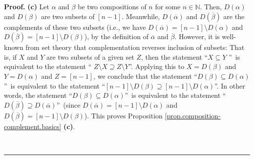 \documentclass[numbers=enddot,12pt,final,onecolumn,notitlepage]{scrartcl}%
\theoremstyle{definition}
\newenvironment{proof}[1][Proof]{\noindent\textbf{#1.} }{\ \rule{0.5em}{0.5em}}
\begin{document}
\begin{proof}
\textbf{(c)} Let $\alpha$ and $\beta$ be two compositions of $n$ for some
$n\in\mathbb{N}$. Then, $D\left(  \alpha\right)  $ and $D\left(  \beta\right)
$ are two subsets of $\left[  n-1\right]  $. Meanwhile, $D\left(
\overline{\alpha}\right)  $ and $D\left(  \overline{\beta}\right)  $ are the
complements of these two subsets (i.e., we have $D\left(  \overline{\alpha
}\right)  =\left[  n-1\right]  \setminus D\left(  \alpha\right)  $ and
$D\left(  \overline{\beta}\right)  =\left[  n-1\right]  \setminus D\left(
\beta\right)  $), by the definition of $\overline{\alpha}$ and $\overline
{\beta}$. However, it is well-known from set theory that complementation
reverses inclusion of subsets: That is, if $X$ and $Y$ are two subsets of a
given set $Z$, then the statement \textquotedblleft$X\subseteq Y$%
\textquotedblright\ is equivalent to the statement \textquotedblleft%
$Z\setminus X\supseteq Z\setminus Y$\textquotedblright. Applying this to
$X=D\left(  \beta\right)  $ and $Y=D\left(  \alpha\right)  $ and $Z=\left[
n-1\right]  $, we conclude that the statement \textquotedblleft$D\left(
\beta\right)  \subseteq D\left(  \alpha\right)  $\textquotedblright\ is
equivalent to the statement \textquotedblleft$\left[  n-1\right]  \setminus
D\left(  \beta\right)  \supseteq\left[  n-1\right]  \setminus D\left(
\alpha\right)  $\textquotedblright. In other words, the statement
\textquotedblleft$D\left(  \beta\right)  \subseteq D\left(  \alpha\right)
$\textquotedblright\ is equivalent to the statement \textquotedblleft$D\left(
\overline{\beta}\right)  \supseteq D\left(  \overline{\alpha}\right)
$\textquotedblright\ (since $D\left(  \overline{\alpha}\right)  =\left[
n-1\right]  \setminus D\left(  \alpha\right)  $ and $D\left(  \overline{\beta
}\right)  =\left[  n-1\right]  \setminus D\left(  \beta\right)  $). This
proves Proposition \ref{prop.composition-complement.basics} \textbf{(c)}.
\medskip


\end{proof}
\end{document}
